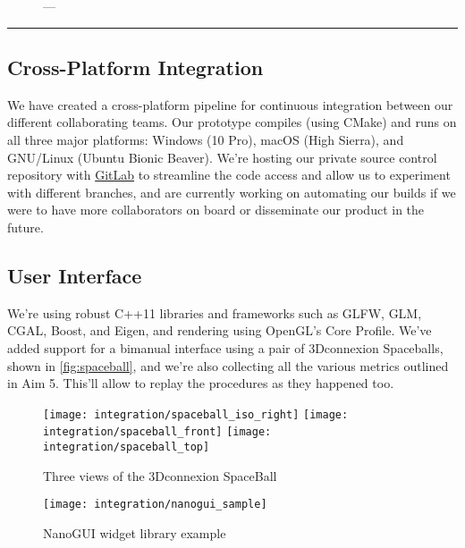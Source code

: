 \begin{figure}
  \centering%
	\caption{---}\label{fig:stereo}
\end{figure}

\hrule%

\subsection{Cross-Platform Integration}\label{ssec:cross}
We have created a cross-platform pipeline for continuous integration between our different collaborating teams. Our prototype compiles (using CMake) and runs on all three major platforms: Windows (10 Pro), macOS (High Sierra), and GNU/Linux (Ubuntu Bionic Beaver). We're hosting our private source control repository with \href{https://gitlab.com}{GitLab} to streamline the code access and allow us to experiment with different branches, and are currently working on automating our builds if we were to have more collaborators on board or disseminate our product in the future.

\subsection{User Interface}\label{ssec:console}

We're using robust C++11 libraries and frameworks such as GLFW, GLM, CGAL, Boost, and Eigen, and rendering using OpenGL's Core Profile. We've added support for a bimanual interface using a pair of 3Dconnexion Spaceballs, shown in \autoref{fig:spaceball}, and we're also collecting all the various metrics outlined in Aim 5. This'll allow to replay the procedures as they happened too.

\begin{figure}
  \centering%
  \texttt{[image: integration/spaceball\_iso\_right]}
  \hfill%
  \texttt{[image: integration/spaceball\_front]}
  \hfill%
  \texttt{[image: integration/spaceball\_top]}
  \caption{Three views of the 3Dconnexion SpaceBall}\label{fig:spaceball}
\end{figure}

\begin{figure}
  \centering%
  \texttt{[image: integration/nanogui\_sample]}
  \caption{NanoGUI widget library example}\label{fig:nanogui}
\end{figure}

